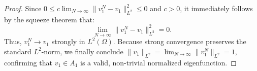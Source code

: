 \documentclass[10pt,a4paper]{amsart}
\begin{document}
\begin{proof}
    Since $0 \leq c \lim_{N \to \infty} \|v_1^N - v_1\|_{L^2}^2 \leq 0$ and $c > 0$, it immediately follows by the squeeze theorem that:
    \begin{equation}
        \lim_{N \to \infty} \|v_1^N - v_1\|_{L^2}^2 = 0.
    \end{equation}
    Thus, $v_1^N \to v_1$ strongly in $L^2(\Omega)$. Because strong convergence preserves the standard $L^2$-norm, we finally conclude $\|v_1\|_{L^2} = \lim_{N \to \infty} \|v_1^N\|_{L^2} = 1$, confirming that $v_1 \in A_1$ is a valid, non-trivial normalized eigenfunction.
\end{proof}
\end{document}
